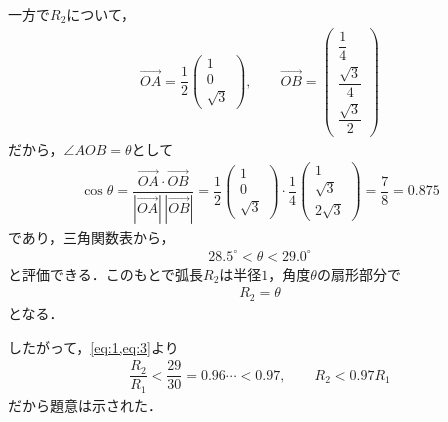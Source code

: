 \documentclass[../../main.tex]{subfiles}
\begin{document}
一方で$R_2$について，
\begin{align}
  \overrightarrow{OA}=\dfrac{1}{2}
  \begin{pmatrix}1\\0\\\sqrt{3}
  \end{pmatrix},\qquad
  \overrightarrow{OB}=
  \begin{pmatrix}\dfrac{1}{4}\\\dfrac{\sqrt{3}}{4}\\\dfrac{\sqrt{3}}{2}
  \end{pmatrix}
\end{align}
だから，$\angle AOB=\theta$として
\begin{align}
  \cos\theta
  =\dfrac{\overrightarrow{OA}\cdot\overrightarrow{OB}}{|\overrightarrow{OA}|\,|\overrightarrow{OB}|}
  =\dfrac{1}{2}
  \begin{pmatrix}1\\0\\\sqrt{3}
  \end{pmatrix}\cdot
  \dfrac{1}{4}
  \begin{pmatrix}1\\\sqrt{3}\\2\sqrt{3}
  \end{pmatrix}
  =\dfrac{7}{8}=0.875
\end{align}
であり，三角関数表から，
\begin{align}
  28.5^\circ<\theta<29.0^\circ \label{eq:2}
\end{align}
と評価できる．このもとで弧長$R_2$は半径$1$，角度$\theta$の扇形部分で
\begin{align}
  R_2=\theta \label{eq:3}
\end{align}
となる．

したがって，\cref{eq:1,eq:3}より
\begin{align}
  \dfrac{R_2}{R_1}<\dfrac{29}{30}=0.96\cdots<0.97,\qquad R_2<0.97R_1
\end{align}
だから題意は示された．
\end{document}
